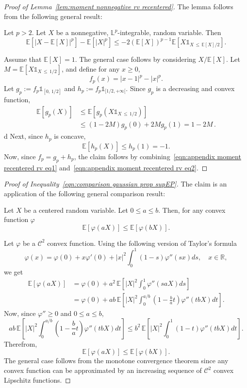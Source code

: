 \documentclass[AHL,Unicode,longabstracts,published]{cedram}
\newcommand{\bE}{\mathbb{E}}
\newcommand{\bL}{\mathbb{L}}
\newcommand{\bR}{\mathbb{R}}
\newcommand{\cC}{\mathcal{C}}
\newcommand{\ind}{\mathds{1}}
\begin{document}
\begin{proof}[Proof of Lemma~\ref{lem:moment nonnegative rv recentered}]
The lemma follows from the following general result:
\begin{lemm}
Let $p>2$. Let $X$ be a nonnegative, $\bL^p$-integrable, random variable. Then
\[
\bE[|X-\bE[X]|^p]-\bE[|X|^p]\leq -2(\bE[X])^{p-1}\bE[X\ind_{X\,\leq\,\bE[X]/2}].
\]
\end{lemm}

Assume that $\bE[X]=1$. The general case follows by considering $X/\bE[X]$. Let $M=\bE[X\ind_{X\,\leq\,1/2}]$, and define for any $x\geq 0$,
\[
f_p(x)=|x-1|^p-|x|^p.
\]
Let $g_p:=f_p\ind_{[0,\,1/2]}$ and $h_p:=f_p\ind_{[1/2, +\infty[}$. Since $g_p$ is a decreasing and convex function,
\begin{equation}\label{eqn:appendix moment recentered rv eq1}
\begin{aligned}
\bE[g_p(X)]&\leq\bE\left[g_p\left(X\ind_{X\,\leq\,1/2}\right)\right]\\
&\leq (1-2M) g_p(0)+2Mg_p(1)=1-2M\,. 
\end{aligned}
\end{equation}d
Next, since $h_p$ is concave,
\begin{equation}\label{eqn:appendix moment recentered rv eq2}
\bE\left[h_p(X)\right]\leq h_p(1)=-1.
\end{equation}
Now, since $f_p=g_p+h_p$, the claim follows by combining~\eqref{eqn:appendix moment recentered rv eq1} and~\eqref{eqn:appendix moment recentered rv eq2}.
\end{proof}

\begin{proof}[Proof of Inequality~\eqref{eqn:comparison gaussian prop supEP}]
The claim is an application of the following general comparison result:
\begin{lemm}
Let $X$ be a centered random variable. Let $0\leq a \leq b$. Then, for any convex function $\varphi$
\[
\bE\left[\varphi(aX)\right]\leq \bE\left[\varphi(bX)\right].
\]
\end{lemm}

Let $\varphi$ be a $\cC^2$ convex function. Using the following version of Taylor's formula
\[
\varphi(x)=\varphi(0)+x\varphi'(0)+|x|^2\int_0^1 (1-s)\varphi''(sx)ds,\quad x\in\bR,
\]
we get
\begin{align*}
\bE\left[\varphi(aX)\right] &= \varphi(0)+a^2\,\bE\left[|X|^2\int_0^1\varphi''(saX)ds\right]\\
&=\varphi(0)+ab\,\bE\left[|X|^2\int_0^{a/b}\left(1-\frac ba t\right)\varphi''(tbX)dt\right].
\end{align*}
Now, since $\varphi''\geq 0$ and $0\leq a\leq b$,
\[
ab\,\bE\left[|X|^2\int_0^{a/b}\left(1-\frac ba t\right)\varphi''(tbX)dt\right]\leq b^2\,\bE\left[|X|^2\int_0^{1}\left(1- t\right)\varphi''(tbX)dt\right].
\]
Therefrom,
\[
\bE[\varphi(aX)]\leq\bE[\varphi(bX)].
\]
The general case follows from the monotone convergence theorem since any convex function can be approximated by an increasing sequence of $\cC^2$ convex Lipschitz functions.
\end{proof}

\end{document}
